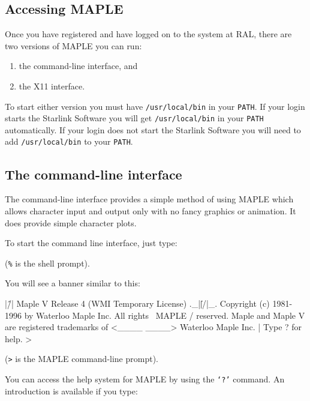 \documentclass[twoside,11pt]{starlink}
\begin{document}
\subsection{Accessing MAPLE}

Once you have registered and have logged on to the system at RAL, there
are two versions of MAPLE you can run:

\begin{enumerate}
\item the command-line interface, and
\item the X11 interface.
\end{enumerate}

To start either version you must have \texttt{/usr/local/bin} in your
\texttt{PATH}.  If your login starts the Starlink Software you will get
\texttt{/usr/local/bin} in your \texttt{PATH} automatically.  If your
login does not start the Starlink Software you will need to add
\texttt{/usr/local/bin} to your \texttt{PATH}.

\subsection{The command-line interface}

The command-line interface provides a simple method of using MAPLE which
allows character input and output only with no fancy graphics or animation.
It does provide simple character plots.

To start the command line interface, just type:

\begin{terminalv}
\end{terminalv}

(\texttt{\%} is the shell prompt).

You will see a banner similar to this:

\begin{terminalv}
    |\^/|     Maple V Release 4 (WMI Temporary License)
._|\|   |/|_. Copyright (c) 1981-1996 by Waterloo Maple Inc. All rights
 \  MAPLE  /  reserved. Maple and Maple V are registered trademarks of
 <____ ____>  Waterloo Maple Inc.
      |       Type ? for help.
>
\end{terminalv}

(\verb+>+ is the MAPLE command-line prompt).

You can access the help system for MAPLE by using the \texttt{`?'} command.
An introduction is available if you type:
\end{document}
